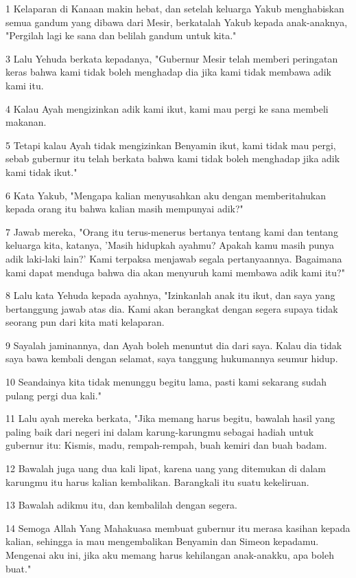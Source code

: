 \par 1 Kelaparan di Kanaan makin hebat, dan setelah keluarga Yakub menghabiskan semua gandum yang dibawa dari Mesir, berkatalah Yakub kepada anak-anaknya, "Pergilah lagi ke sana dan belilah gandum untuk kita."
\par 3 Lalu Yehuda berkata kepadanya, "Gubernur Mesir telah memberi peringatan keras bahwa kami tidak boleh menghadap dia jika kami tidak membawa adik kami itu.
\par 4 Kalau Ayah mengizinkan adik kami ikut, kami mau pergi ke sana membeli makanan.
\par 5 Tetapi kalau Ayah tidak mengizinkan Benyamin ikut, kami tidak mau pergi, sebab gubernur itu telah berkata bahwa kami tidak boleh menghadap jika adik kami tidak ikut."
\par 6 Kata Yakub, "Mengapa kalian menyusahkan aku dengan memberitahukan kepada orang itu bahwa kalian masih mempunyai adik?"
\par 7 Jawab mereka, "Orang itu terus-menerus bertanya tentang kami dan tentang keluarga kita, katanya, 'Masih hidupkah ayahmu? Apakah kamu masih punya adik laki-laki lain?' Kami terpaksa menjawab segala pertanyaannya. Bagaimana kami dapat menduga bahwa dia akan menyuruh kami membawa adik kami itu?"
\par 8 Lalu kata Yehuda kepada ayahnya, "Izinkanlah anak itu ikut, dan saya yang bertanggung jawab atas dia. Kami akan berangkat dengan segera supaya tidak seorang pun dari kita mati kelaparan.
\par 9 Sayalah jaminannya, dan Ayah boleh menuntut dia dari saya. Kalau dia tidak saya bawa kembali dengan selamat, saya tanggung hukumannya seumur hidup.
\par 10 Seandainya kita tidak menunggu begitu lama, pasti kami sekarang sudah pulang pergi dua kali."
\par 11 Lalu ayah mereka berkata, "Jika memang harus begitu, bawalah hasil yang paling baik dari negeri ini dalam karung-karungmu sebagai hadiah untuk gubernur itu: Kismis, madu, rempah-rempah, buah kemiri dan buah badam.
\par 12 Bawalah juga uang dua kali lipat, karena uang yang ditemukan di dalam karungmu itu harus kalian kembalikan. Barangkali itu suatu kekeliruan.
\par 13 Bawalah adikmu itu, dan kembalilah dengan segera.
\par 14 Semoga Allah Yang Mahakuasa membuat gubernur itu merasa kasihan kepada kalian, sehingga ia mau mengembalikan Benyamin dan Simeon kepadamu. Mengenai aku ini, jika aku memang harus kehilangan anak-anakku, apa boleh buat."
